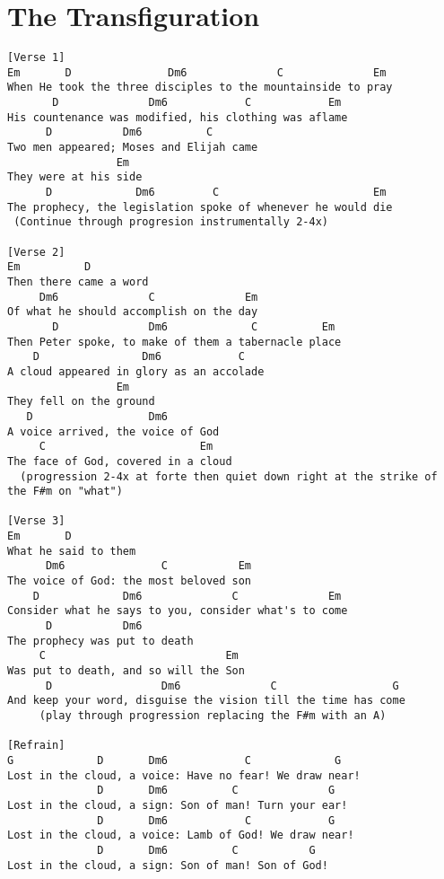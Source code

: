 \documentclass[leqno]{memoir}
\begin{document}
\chapter{The Transfiguration}
\begin{verbatim}
[Verse 1]
Em       D               Dm6              C              Em
When He took the three disciples to the mountainside to pray
       D              Dm6            C            Em
His countenance was modified, his clothing was aflame
      D           Dm6          C
Two men appeared; Moses and Elijah came
                 Em
They were at his side
      D             Dm6         C                        Em
The prophecy, the legislation spoke of whenever he would die
 (Continue through progresion instrumentally 2-4x)
 
[Verse 2]
Em          D
Then there came a word
     Dm6              C              Em
Of what he should accomplish on the day
       D              Dm6             C          Em
Then Peter spoke, to make of them a tabernacle place
    D                Dm6            C
A cloud appeared in glory as an accolade
                 Em
They fell on the ground
   D                  Dm6
A voice arrived, the voice of God
     C                        Em
The face of God, covered in a cloud
  (progression 2-4x at forte then quiet down right at the strike of the F#m on "what")
 
[Verse 3]
Em       D
What he said to them
      Dm6               C           Em
The voice of God: the most beloved son
    D             Dm6              C              Em
Consider what he says to you, consider what's to come
      D           Dm6
The prophecy was put to death
     C                            Em
Was put to death, and so will the Son
      D                 Dm6              C                  G
And keep your word, disguise the vision till the time has come
     (play through progression replacing the F#m with an A)
 
[Refrain]
G             D       Dm6            C             G
Lost in the cloud, a voice: Have no fear! We draw near!
              D       Dm6          C              G
Lost in the cloud, a sign: Son of man! Turn your ear!
              D       Dm6            C            G
Lost in the cloud, a voice: Lamb of God! We draw near!
              D       Dm6          C           G
Lost in the cloud, a sign: Son of man! Son of God!
\end{verbatim}
\newpage
\end{document}
